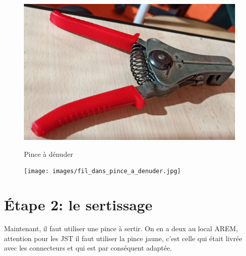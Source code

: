 \documentclass{article}
\begin{document}
\begin{figure}[h]
    \begin{minipage}{0.45\textwidth}
        \centering
        \includegraphics[width=\linewidth]{images/pince_pour_denuder.jpg}
        \captionsetup{labelformat=empty}
        \caption{Pince à dénuder}
        \label{fig:image1}
    \end{minipage}
    \hfill
    \begin{minipage}{0.45\textwidth}
        \centering
        \texttt{[image: images/fil\_dans\_pince\_a\_denuder.jpg]}
        \captionsetup{labelformat=empty}
        \caption{}
        \label{fig:image2}
    \end{minipage}
\end{figure}

\newpage
\section*{Étape 2: le sertissage}

Maintenant, il faut utiliser une pince à sertir. On en a deux au local AREM, attention pour les JST il faut utiliser la pince jaune, c'est celle qui était livrée avec les connecteurs et qui est par conséquent adaptée. 
\end{document}
